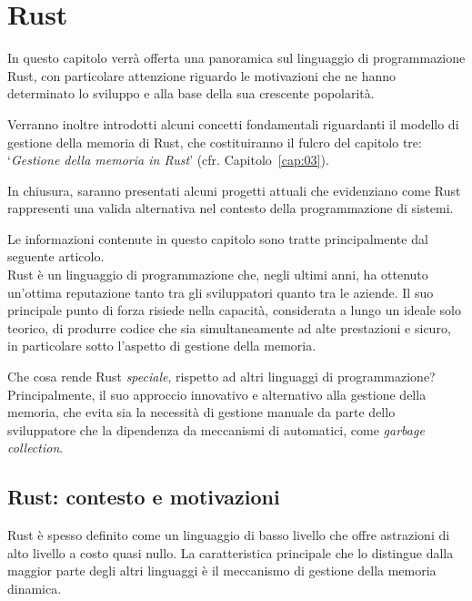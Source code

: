 
\chapter{Rust}\label{cap:02}

In questo capitolo verrà offerta una panoramica sul linguaggio di programmazione Rust, con particolare attenzione riguardo
le motivazioni che ne hanno determinato lo sviluppo e alla base della sua crescente popolarità.

Verranno inoltre introdotti alcuni concetti fondamentali riguardanti il modello di gestione della memoria di Rust, 
che costituiranno il fulcro del capitolo tre: `\textit{Gestione della memoria in Rust}' (cfr. Capitolo~\ref{cap:03}).

In chiusura, saranno presentati alcuni progetti attuali che evidenziano come Rust rappresenti una valida alternativa nel contesto della programmazione di sistemi.

Le informazioni contenute in questo capitolo sono tratte principalmente dal seguente articolo\cite{rust-2023-interview}.
\vspace{15pt}\\
\noindent Rust è un linguaggio di programmazione che, negli ultimi anni, ha ottenuto un'ottima reputazione  
tanto tra gli sviluppatori quanto tra le aziende. Il suo principale punto di forza risiede nella 
capacità, considerata a lungo un ideale solo teorico, di produrre codice che sia simultaneamente 
ad alte prestazioni e sicuro, in particolare sotto l'aspetto di gestione della memoria.

Che cosa rende Rust \textit{speciale}, rispetto ad altri linguaggi di programmazione? Principalmente, il suo approccio innovativo e alternativo alla gestione della memoria, che evita sia la necessità di gestione manuale da parte dello sviluppatore che la dipendenza da meccanismi di automatici, come \textit{garbage collection}.

\section{Rust: contesto e motivazioni}
Rust è spesso definito come un linguaggio di basso livello 
che offre astrazioni di alto livello a costo quasi nullo.
La caratteristica principale che lo distingue dalla maggior parte degli altri linguaggi è il meccanismo
 di gestione della memoria dinamica. 

